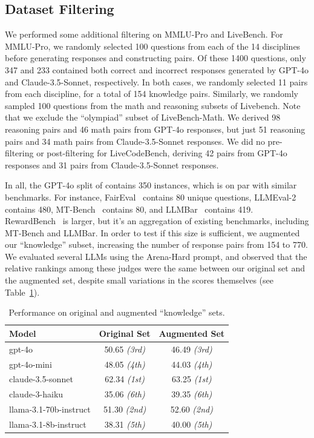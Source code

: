 \documentclass{article} %
\begin{document}
\subsection{Dataset Filtering}
\label{appendix:filtering}
We performed some additional filtering on MMLU-Pro and LiveBench. For MMLU-Pro, we randomly selected 100 questions from each of the 14 disciplines before generating responses and constructing pairs. Of these 1400 questions, only 347 and 233 contained both correct and incorrect responses generated by GPT-4o and Claude-3.5-Sonnet, respectively. In both cases, we randomly selected 11 pairs from each discipline, for a total of 154 knowledge pairs. Similarly, we randomly sampled 100 questions from the math and reasoning subsets of Livebench. Note that we exclude the ``olympiad'' subset of LiveBench-Math. We derived 98 reasoning pairs and 46 math pairs from GPT-4o responses, but just 51 reasoning pairs and 34 math pairs from Claude-3.5-Sonnet responses. We did no pre-filtering or post-filtering for LiveCodeBench, deriving 42 pairs from GPT-4o responses and 31 pairs from Claude-3.5-Sonnet responses.

In all, the GPT-4o split of \sys contains 350 instances, which is on par with similar benchmarks. For instance, FairEval~\citep{wang2023faireval} contains 80 unique questions, LLMEval-2~\citep{zhang2023llmeval2} contains 480, MT-Bench~\citep{zheng2024judging} contains 80, and LLMBar~\citep{llmbar} contains 419. RewardBench~\citep{lambert2024rewardbench} is larger, but it's an aggregation of existing benchmarks, including MT-Bench and LLMBar. In order to test if this size is sufficient, we augmented our ``knowledge'' subset, increasing the number of response pairs from 154 to 770. We evaluated several LLMs using the Arena-Hard prompt, and observed that the relative rankings among these judges were the same between our original set and the augmented set, despite small variations in the scores themselves (see Table~\ref{table:dataset-size}).

\begin{table}[h]
    \centering
    \begin{tabular}{lcc}
        \toprule
        \textbf{Model} & \textbf{Original Set} & \textbf{Augmented Set} \\
        \midrule
        gpt-4o & 50.65 \textit{(3rd)} & 46.49 \textit{(3rd)} \\
        gpt-4o-mini & 48.05 \textit{(4th)} & 44.03 \textit{(4th)} \\
        claude-3.5-sonnet & 62.34 \textit{(1st)} & 63.25 \textit{(1st)} \\
        claude-3-haiku & 35.06 \textit{(6th)} & 39.35 \textit{(6th)} \\
        llama-3.1-70b-instruct & 51.30 \textit{(2nd)} & 52.60 \textit{(2nd)} \\
        llama-3.1-8b-instruct & 38.31 \textit{(5th)} & 40.00 \textit{(5th)} \\
        \bottomrule
    \end{tabular}
    \caption{Performance on original and augmented ``knowledge'' sets.}
    \label{table:dataset-size}
\end{table}
\end{document}
